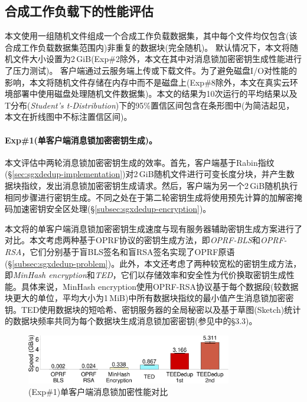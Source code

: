 \subsection{合成工作负载下的性能评估}
\label{subsec:sgxdedup-synthetic}

本文使用一组随机文件组成一个合成工作负载数据集，其中每个文件均仅包含(该合成工作负载数据集范围内)非重复的数据块(完全随机)。 默认情况下，本文将随机文件大小设置为2\,GiB(Exp\#2除外，本文在其中对消息锁加密密钥生成性能进行了压力测试)。 客户端通过云服务端上传或下载文件。为了避免磁盘I/O对性能的影响，本文将随机文件存储在内存中而不是磁盘上(Exp\#8除外，本文在真实云环境部署中使用磁盘处理随机文件数据集)。本文的结果为10次运行的平均结果以及T分布(\textit{Student's t-Distribution})下的95\%置信区间包含在条形图中(为简洁起见，本文在折线图中不标注置信区间)。

\paragraph*{Exp\#1(单客户端消息锁加密密钥生成)。}本文评估\sysnameS 中两轮消息锁加密密钥生成的效率。首先，客户端基于Rabin指纹(\S\ref{sec:sgxdedup-implementation})对2\,GiB随机文件进行可变长度分块，并产生数据块指纹，发出消息锁加密密钥生成请求。然后，客户端为另一个2\,GiB随机执行相同步骤进行密钥生成。不同之处在于第二轮密钥生成将使用预先计算的加解密掩码加速密钥安全区处理(\S\ref{subsec:sgxdedup-encryption})。

本文将\sysnameS 的单客户端消息锁加密密钥生成速度与现有服务器辅助密钥生成方案进行了对比。本文考虑两种基于OPRF协议的密钥生成方法，即\textit{OPRF-BLS}\cite{armknecht2015transparent}和\textit{OPRF-RSA}\cite{bellare2013DupLESS}，它们分别基于盲BLS签名和盲RSA签名实现了OPRF原语(\S\ref{subsec:sgxdedup-problem})。此外，本文还考虑了两种较宽松的密钥生成方法，即\textit{MinHash encryption}\cite{qin17}和\textit{TED}\cite{li2020TED}，它们以存储效率和安全性为代价换取密钥生成性能。具体来说，MinHash encryption使用OPRF-RSA协议基于每个数据段(较数据块更大的单位，平均大小为1\,MiB)中所有数据块指纹的最小值产生消息锁加密密钥。TED使用数据块的短哈希、密钥服务器的全局秘密以及基于草图(Sketch)统计的数据块频率共同为每个数据块生成消息锁加密密钥(参见\cite{li2020TED}中的\S3.3)。

\begin{figure}[!htb]
    \centering
    \includegraphics[width=0.8\textwidth]{pic/sgxdedup/plot/exp_a2/expa2_keyGenPerformance.pdf}
    \caption{(Exp\#1)单客户端消息锁加密性能对比}
    \label{fig:sgxdedup-keygen-comparison}
\end{figure}

